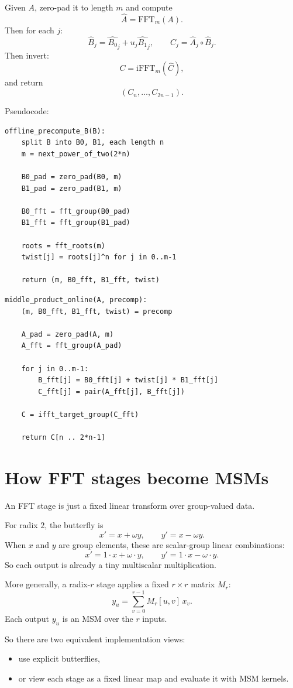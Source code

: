\documentclass[11pt]{article}
\begin{document}
Given $A$, zero-pad it to length $m$ and compute
\[
\widehat{A} = \mathrm{FFT}_m(A).
\]
Then for each $j$:
\[
\widehat{B}_j = \widehat{B_0}_j + u_j \widehat{B_1}_j,
\qquad
\widehat{C}_j = \widehat{A}_j \circ \widehat{B}_j.
\]
Then invert:
\[
C = \mathrm{iFFT}_m(\widehat{C}),
\]
and return
\[
(C_n,\dots,C_{2n-1}).
\]

Pseudocode:

\begin{lstlisting}
offline_precompute_B(B):
    split B into B0, B1, each length n
    m = next_power_of_two(2*n)

    B0_pad = zero_pad(B0, m)
    B1_pad = zero_pad(B1, m)

    B0_fft = fft_group(B0_pad)
    B1_fft = fft_group(B1_pad)

    roots = fft_roots(m)
    twist[j] = roots[j]^n for j in 0..m-1

    return (m, B0_fft, B1_fft, twist)
\end{lstlisting}

\begin{lstlisting}
middle_product_online(A, precomp):
    (m, B0_fft, B1_fft, twist) = precomp

    A_pad = zero_pad(A, m)
    A_fft = fft_group(A_pad)

    for j in 0..m-1:
        B_fft[j] = B0_fft[j] + twist[j] * B1_fft[j]
        C_fft[j] = pair(A_fft[j], B_fft[j])

    C = ifft_target_group(C_fft)

    return C[n .. 2*n-1]
\end{lstlisting}

\section{How FFT stages become MSMs}

An FFT stage is just a fixed linear transform over group-valued data.

For radix $2$, the butterfly is
\[
x' = x + \omega y,
\qquad
y' = x - \omega y.
\]
When $x$ and $y$ are group elements, these are scalar-group linear combinations:
\[
x' = 1 \cdot x + \omega \cdot y,
\qquad
y' = 1 \cdot x - \omega \cdot y.
\]
So each output is already a tiny multiscalar multiplication.

More generally, a radix-$r$ stage applies a fixed $r \times r$ matrix $M_r$:
\[
y_u = \sum_{v=0}^{r-1} M_r[u,v] \, x_v.
\]
Each output $y_u$ is an MSM over the $r$ inputs.

So there are two equivalent implementation views:
\begin{itemize}[itemsep=0.3em, topsep=0.4em]
  \item use explicit butterflies,
  \item or view each stage as a fixed linear map and evaluate it with MSM kernels.
\end{itemize}
\end{document}
